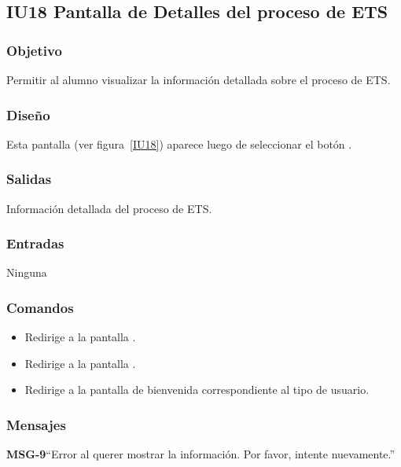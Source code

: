 \subsection{IU18 Pantalla de Detalles del proceso de ETS}

\subsubsection{Objetivo}
Permitir al alumno visualizar la información detallada sobre el proceso de ETS.

\subsubsection{Diseño}
Esta pantalla  (ver figura~\ref{IU18}) aparece luego de seleccionar el botón . 


\subsubsection{Salidas}

Información detallada del proceso de ETS. 

\subsubsection{Entradas}
Ninguna


\subsubsection{Comandos}
\begin{itemize}
	\item {} Redirige a la pantalla .
	\item {} Redirige a la pantalla .
	\item {} Redirige a la pantalla de bienvenida correspondiente al tipo de usuario.
\end{itemize}
\subsubsection{Mensajes}

\begin{Citemize}
	\item {\bf MSG-9}{``Error al querer mostrar la información. Por favor, intente nuevamente.''}
\end{Citemize}

